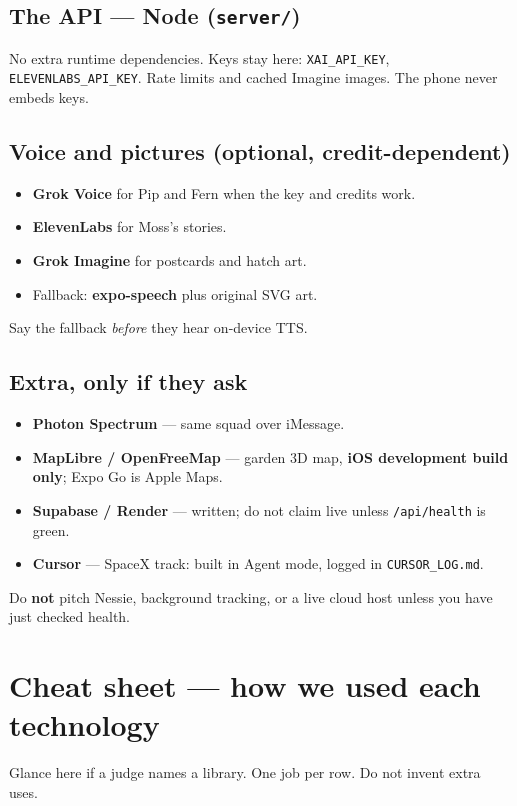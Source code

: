 \documentclass[11pt]{article}
\begin{document}
\subsection{The API --- Node (\texttt{server/})}
No extra runtime dependencies. Keys stay here: \texttt{XAI\_API\_KEY},
\texttt{ELEVENLABS\_API\_KEY}. Rate limits and cached Imagine images. The phone never
embeds keys.

\subsection{Voice and pictures (optional, credit-dependent)}
\begin{itemize}
  \item \textbf{Grok Voice} for Pip and Fern when the key and credits work.
  \item \textbf{ElevenLabs} for Moss's stories.
  \item \textbf{Grok Imagine} for postcards and hatch art.
  \item Fallback: \textbf{expo-speech} plus original SVG art.
\end{itemize}
Say the fallback \emph{before} they hear on-device TTS.

\subsection{Extra, only if they ask}
\begin{itemize}
  \item \textbf{Photon Spectrum} --- same squad over iMessage.
  \item \textbf{MapLibre / OpenFreeMap} --- garden 3D map, \textbf{iOS development
        build only}; Expo Go is Apple Maps.
  \item \textbf{Supabase / Render} --- written; do not claim live unless
        \texttt{/api/health} is green.
  \item \textbf{Cursor} --- SpaceX track: built in Agent mode, logged in
        \texttt{CURSOR\_LOG.md}.
\end{itemize}

Do \textbf{not} pitch Nessie, background tracking, or a live cloud host unless you
have just checked health.

\section{Cheat sheet --- how we used each technology}
Glance here if a judge names a library. One job per row. Do not invent extra uses.
\end{document}

